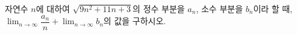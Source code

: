 자연수 $n$에 대하여 $\sqrt{9n^2+11n+3}$의 정수 부분을 $a_n$, 소수 부분을 $b_n$이라 할 때, $\displaystyle\lim_{n\to\infty}\dfrac{a_n}{n}+\lim_{n\to\infty}b_n$의 값을 구하시오.

